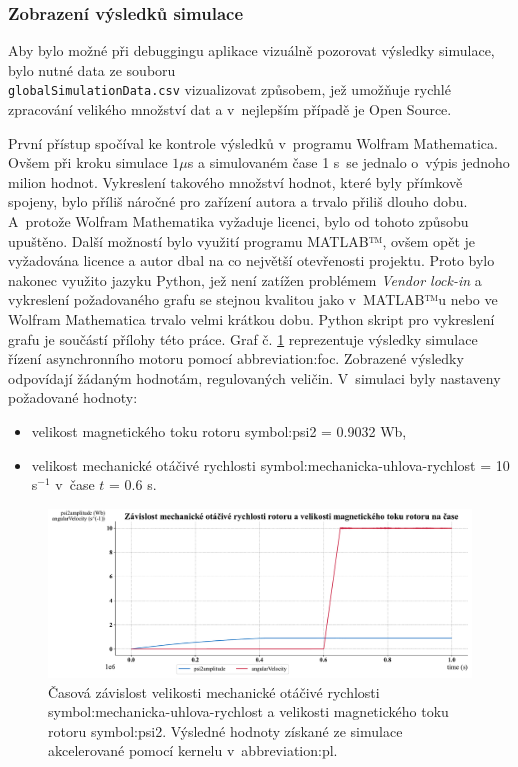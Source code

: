 \documentclass[a4paper, twoside, 11pt]{article}
\begin{document}
			\subsubsection{Zobrazení výsledků simulace}\label{subsubsec:zobrazeni-vysledku-simulace}
			Aby bylo možné při debuggingu aplikace vizuálně pozorovat výsledky simulace, bylo nutné data ze souboru\\\texttt{globalSimulationData.csv} vizualizovat způsobem, jež umožňuje rychlé zpracování velikého množství dat a v~nejlepším případě je Open Source.\par
			První přístup spočíval ke kontrole výsledků v~programu Wolfram Mathematica. Ovšem při kroku simulace $1 \mu$s a simulovaném čase 1 s~se jednalo o~výpis jednoho milion hodnot. Vykreslení takového množství hodnot, které byly přímkově spojeny, bylo příliš náročné pro zařízení autora a trvalo přiliš dlouho dobu. A~protože Wolfram Mathematika vyžaduje licenci, bylo od tohoto způsobu upuštěno. Další možností bylo využití programu MATLAB™, ovšem opět je vyžadována licence a autor dbal na co největší otevřenosti projektu. Proto bylo nakonec využito jazyku Python, jež není zatížen problémem \textit{Vendor lock-in} a vykreslení požadovaného grafu se stejnou kvalitou jako v~MATLAB™u nebo ve Wolfram Mathematica trvalo velmi krátkou dobu. Python skript pro vykreslení grafu je součástí přílohy této práce. Graf č. \ref{fig:k26-simulace-graf-mechanicka-rychlost-velikost-mg-toku-rotoru} reprezentuje výsledky simulace řízení asynchronního motoru pomocí \gls{abbreviation:foc}. Zobrazené výsledky odpovídají žádaným hodnotám, regulovaných veličin. V~simulaci byly nastaveny požadované hodnoty:
			\begin{itemize}
				\item velikost magnetického toku rotoru \gls{symbol:psi2} = 0.9032 Wb,
				\item velikost mechanické otáčivé rychlosti \gls{symbol:mechanicka-uhlova-rychlost} = 10 s$^{-1}$ v~čase $t$ = 0.6 s.
			\end{itemize}

			


		\begin{figure}[htbp!]
			\centering
			\includegraphics[width=1\textwidth]{src/pdf/k26-simulace-graf-mechanicka-rychlost-velikost-mg-toku-rotoru.pdf}
			\caption{Časová závislost velikosti mechanické otáčivé rychlosti \gls{symbol:mechanicka-uhlova-rychlost} a velikosti magnetického toku rotoru \gls{symbol:psi2}. Výsledné hodnoty získané ze simulace akcelerované pomocí kernelu v~\gls{abbreviation:pl}.}
			\label{fig:k26-simulace-graf-mechanicka-rychlost-velikost-mg-toku-rotoru}
		\end{figure}
\end{document}
